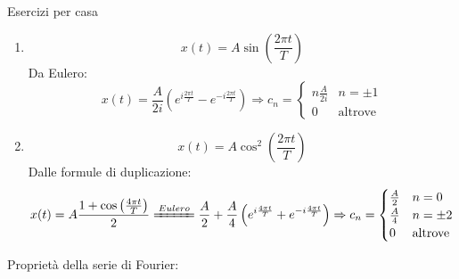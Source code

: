 \documentclass{article}
\begin{document}
\large Esercizi per casa\normalsize
\begin{enumerate}
    \item \[x(t)=A\sin\left(\frac{2\pi t}{T}\right)\]
        Da Eulero:
        \[x(t)=\frac{A}{2i}\left(e^{i\frac{2\pi t}{T}}-e^{-i\frac{2\pi t}{T}}\right)\Rightarrow c_n=\begin{cases}n\frac{A}{2i}&n=\pm1\\0&\text{altrove}\end{cases}\]
    \item \[x(t)=A\cos^2\left(\frac{2\pi t}{T}\right)\]
        Dalle formule di duplicazione:
        \[x(t)=A\frac{1+\cos\left(\frac{4\pi t}{T}\right)}{2}\xlongequal{Eulero}\frac{A}{2}+\frac{A}{4}\left(e^{i\frac{4\pi t}{T}}+e^{-i\frac{4\pi t}{T}}\right)\Rightarrow c_n=\begin{cases}
            \frac{A}{2}&n=0\\
            \frac{A}{4}&n=\pm2\\
            0&\text{altrove}
        \end{cases}\]
\end{enumerate}
\Large Proprietà della serie di Fourier:
\end{document}
